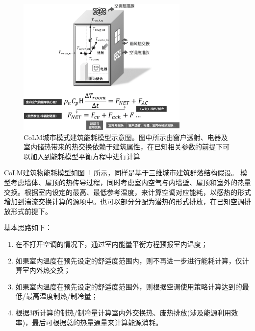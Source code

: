 {
\begin{figure}[htbp]
\centering
\includegraphics[width=0.75\textwidth]{Figures/城市模式/CoLM城市模式建筑能耗示意图.png}
\caption{CoLM城市模式建筑能耗模型示意图。图中所示由窗户透射、电器及室内储热带来的热交换依赖于建筑属性，在已知相关参数的前提下可以加入到能耗模型平衡方程中进行计算}
\label{fig:建筑能耗模型示意图}
\end{figure}
}

CoLM建筑物能耗模型如图~\ref{fig:建筑能耗模型示意图} 所示，同样是基于三维城市建筑群落结构假设。
模型考虑墙体、屋顶的热传导过程，同时考虑室内空气与内墙壁、屋顶和室外的热量交换。根据室内设定的最高、最低参考温度，来计算空调对应能耗，以感热的形式增加到湍流交换计算的源项中。也可以部分分配为潜热的形式排放，在已知空调排放形式前提下。

基本思路如下：

\begin{enumerate}
    \item 在不打开空调的情况下，通过室内能量平衡方程预报室内温度；
    \item 如果室内温度在预先设定的舒适度范围内，则不再进一步进行能耗计算，仅计算室内外热交换；
    \item 如果室内温度在预先设定的舒适度范围外，则根据空调使用策略计算达到的最低/最高温度制热/制冷量；
    \item 根据3所计算的制热/制冷量计算室内外交换热、废热排放(涉及能源利用效率)，最后可根据总的热量通量来计算能源消耗。
\end{enumerate}

